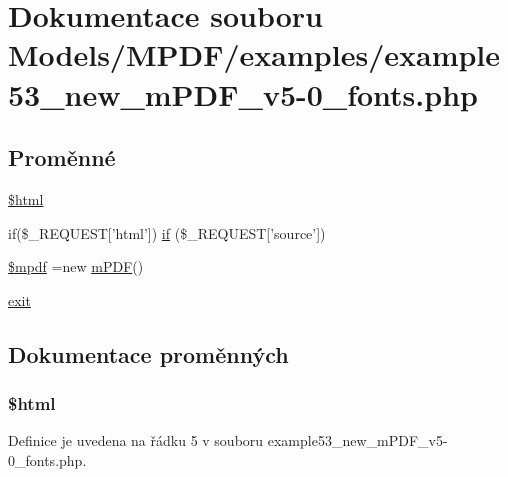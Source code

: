 \hypertarget{example53__new__m_p_d_f__v5-0__fonts_8php}{\section{Dokumentace souboru Models/\-M\-P\-D\-F/examples/example53\-\_\-new\-\_\-m\-P\-D\-F\-\_\-v5-\/0\-\_\-fonts.php}
\label{example53__new__m_p_d_f__v5-0__fonts_8php}
}
\subsection*{Proměnné}
\begin{DoxyCompactItemize}
\item 
\hyperlink{example53__new__m_p_d_f__v5-0__fonts_8php_a6f96e7fc92441776c9d1cd3386663b40}{\$html}
\item 
if(\$\-\_\-\-R\-E\-Q\-U\-E\-S\-T\mbox{[}'html'\mbox{]}) \hyperlink{example53__new__m_p_d_f__v5-0__fonts_8php_ae022de9879dfd38cb750eddebfe003fe}{if} (\$\-\_\-\-R\-E\-Q\-U\-E\-S\-T\mbox{[}'source'\mbox{]})
\item 
\hyperlink{example53__new__m_p_d_f__v5-0__fonts_8php_ad028f81910d6cbab9b184d2214b3a8f8}{\$mpdf} =new \hyperlink{classm_p_d_f}{m\-P\-D\-F}()
\item 
\hyperlink{example53__new__m_p_d_f__v5-0__fonts_8php_a6733eb5f605d09eaede9845835d71c4e}{exit}
\end{DoxyCompactItemize}


\subsection{Dokumentace proměnných}
\hypertarget{example53__new__m_p_d_f__v5-0__fonts_8php_a6f96e7fc92441776c9d1cd3386663b40}{
\subsubsection[{\$html}]{\setlength{\rightskip}{0pt plus 5cm}\$html}}\label{example53__new__m_p_d_f__v5-0__fonts_8php_a6f96e7fc92441776c9d1cd3386663b40}


Definice je uvedena na řádku 5 v souboru example53\-\_\-new\-\_\-m\-P\-D\-F\-\_\-v5-\/0\-\_\-fonts.\-php.

